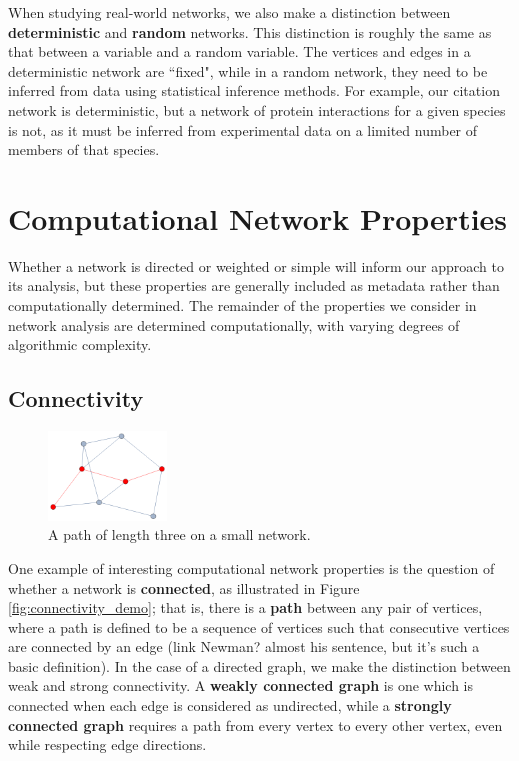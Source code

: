\documentclass[12pt]{thesis}
\theoremstyle{plain}
\theoremstyle{definition}
\theoremstyle{remark}
\begin{document}
When studying real-world networks, we also make a distinction between \textbf{deterministic} and \textbf{random} networks. This distinction is roughly the same as that between a variable and a random variable. The vertices and edges in a deterministic network are ``fixed", while in a random network, they need to be inferred from data using statistical inference methods. For example, our citation network is deterministic, but a network of protein interactions for a given species is not, as it must be inferred from experimental data on a limited number of members of that species.









\section{Computational Network Properties}
Whether a network is directed or weighted or simple will inform our approach to its analysis, but these properties are generally included as metadata rather than computationally determined. The remainder of the properties we consider in network analysis are determined computationally, with varying degrees of algorithmic complexity.




\subsection{Connectivity}

\begin{figure}
\centering
\vspace{-20pt}
\includegraphics[width=0.28\textwidth]{path_demo.png}
\caption{A path of length three on a small network.}
\vspace{-20pt}
\label{fig:path_demo}
\end{figure}

One example of interesting computational network properties is the question of whether a network is \textbf{connected}, as illustrated in Figure \ref{fig:connectivity_demo}; that is, there is a \textbf{path} between any pair of vertices, where a path is defined to be a sequence of vertices such that consecutive vertices are connected by an edge (link Newman? almost his sentence, but it's such a basic definition). In the case of a directed graph, we make the distinction between weak and strong connectivity. A \textbf{weakly connected graph} is one which is connected when each edge is considered as undirected, while a \textbf{strongly connected graph} requires a path from every vertex to every other vertex, even while respecting edge directions. 
\end{document}
